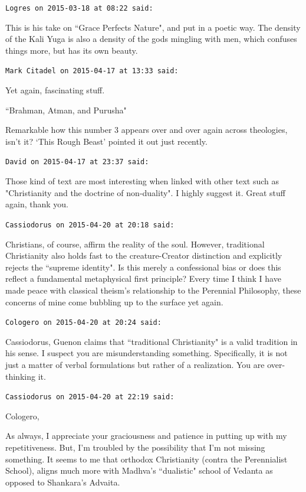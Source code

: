 \begin{footnotesize}
\begin{sffamily}
\hfill

\texttt{Logres on 2015-03-18 at 08:22 said: }

This is his take on ``Grace Perfects Nature", and put in a poetic way. The density of the Kali Yuga is also a density of the gods mingling with men, which confuses things more, but has its own beauty.


\hfill

\texttt{Mark Citadel on 2015-04-17 at 13:33 said: }

Yet again, fascinating stuff.

``Brahman, Atman, and Purusha"

Remarkable how this number 3 appears over and over again across theologies, isn't it? `This Rough Beast' pointed it out just recently.


\hfill

\texttt{David on 2015-04-17 at 23:37 said: }

Those kind of text are most interesting when linked with other text such as "Christianity and the doctrine of non-duality". I highly suggest it. Great stuff again, thank you.


\hfill

\texttt{Cassiodorus on 2015-04-20 at 20:18 said: }

Christians, of course, affirm the reality of the soul. However, traditional Christianity also holds fast to the creature-Creator distinction and explicitly rejects the ``supreme identity". Is this merely a confessional bias or does this reflect a fundamental metaphysical first principle? Every time I think I have made peace with classical theism's relationship to the Perennial Philosophy, these concerns of mine come bubbling up to the surface yet again.


\hfill

\texttt{Cologero on 2015-04-20 at 20:24 said: }

Cassiodorus, Guenon claims that ``traditional Christianity" is a valid tradition in his sense. I suspect you are misunderstanding something. Specifically, it is not just a matter of verbal formulations but rather of a realization. You are over-thinking it.


\hfill

\texttt{Cassiodorus on 2015-04-20 at 22:19 said: }

Cologero,

As always, I appreciate your graciousness and patience in putting up with my repetitiveness. But, I'm troubled by the possibility that I'm not missing something. It seems to me that orthodox Christianity (contra the Perennialist School), aligns much more with Madhva's ``dualistic" school of Vedanta as opposed to Shankara's Advaita. 


\end{sffamily}
\end{footnotesize}
